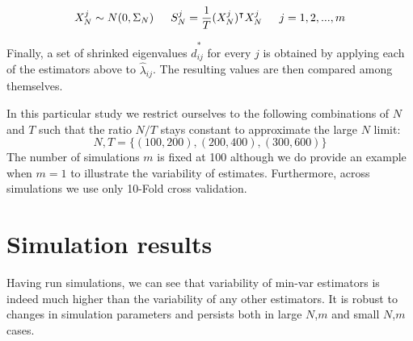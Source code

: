 \documentclass{article}
\begin{document}
$$ X^j_N \sim N(0,\Sigma_N) \indent S_N^j = \dfrac{1}{T} (X_N^j)^\intercal X_N^j \indent  j =1,2,...,m$$ 

\noindent Finally, a set of shrinked eigenvalues $\hat{d}^*_{ij}$ for every $j$ is obtained by applying each of the estimators above to $\hat{\lambda}_{ij}$. The resulting values are then compared among themselves.

In this particular study we restrict ourselves to the following combinations of $N$ and $T$ such that the ratio $N/T$ stays constant to approximate the large $N$ limit: $$ N,T = \{(100,200),(200,400),(300,600)\} $$
The number of simulations $m$ is fixed at 100 although we do provide an example when $m=1$ to illustrate the variability of estimates. Furthermore, across simulations we use only 10-Fold cross validation.


\section{Simulation results}

Having run simulations, we can see that variability of min-var estimators is indeed much higher than the variability of any other estimators. It is robust to changes in simulation parameters and persists both in large $N$,$m$ and small $N$,$m$ cases.















 

\end{document}
